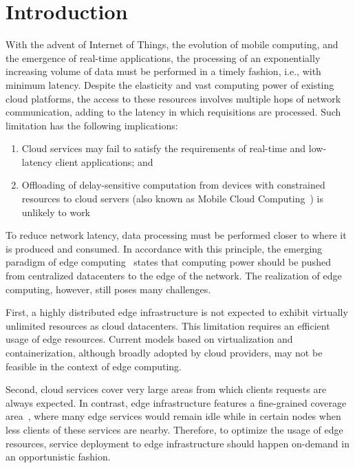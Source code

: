 \section{Introduction}

With the advent of Internet of Things, the evolution of mobile computing, and the emergence of real-time applications, the processing of an exponentially increasing volume of data must be performed in a timely fashion, i.e., with minimum latency. Despite the elasticity and vast computing power of existing cloud platforms, the access to these resources involves multiple hops of network communication, adding to the latency in which requisitions are processed. Such limitation has the following implications:

\begin{enumerate}

\item Cloud services may fail to satisfy the requirements of real-time and low-latency client applications; and

\item Offloading of delay-sensitive computation from devices with constrained resources to cloud servers (also known as Mobile Cloud Computing~\cite{}) is unlikely to work

\end{enumerate}

To reduce network latency, data processing must be performed closer to where it is produced and consumed. In accordance with this principle, the emerging paradigm of edge computing~\cite{} states that computing power should be pushed from centralized datacenters to the edge of the network. The realization of edge computing, however, still poses many challenges. 

%
First, a highly distributed edge infrastructure is not expected to exhibit virtually unlimited resources as cloud datacenters. This limitation requires an efficient usage of edge resources. Current models based on virtualization and containerization, although broadly adopted by cloud providers, may not be feasible in the context of edge computing.

Second, cloud services cover very large areas from which clients requests are always expected. In contrast, edge infrastructure features a fine-grained coverage area~\cite{5Gchallenges}, where many edge services would remain idle while in certain nodes when less clients of these services are nearby. Therefore, to optimize the usage of edge resources, service deployment to edge infrastructure should happen on-demand in an opportunistic fashion. 

